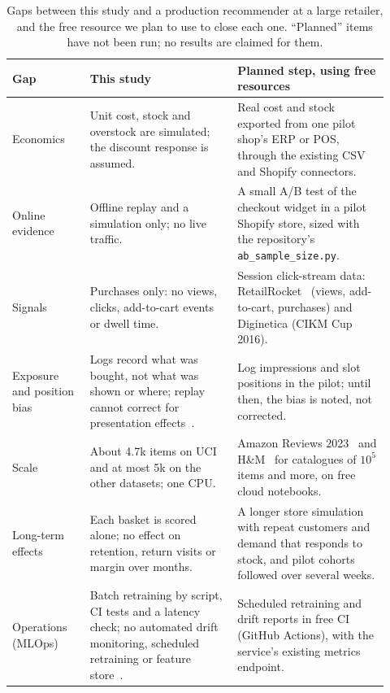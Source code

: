 \documentclass[11pt]{article}
\begin{document}
\begin{table}[t]
\centering
\caption{Gaps between this study and a production recommender at a large retailer, and the free resource we plan to use to close each one. ``Planned'' items have not been run; no results are claimed for them.}
\label{tab:gaps}
\small
\begin{tabular}{p{0.19\linewidth}p{0.36\linewidth}p{0.37\linewidth}}
\toprule
Gap & This study & Planned step, using free resources \\
\midrule
Economics & Unit cost, stock and overstock are simulated; the discount response is assumed. & Real cost and stock exported from one pilot shop's ERP or POS, through the existing CSV and Shopify connectors. \\
Online evidence & Offline replay and a simulation only; no live traffic. & A small A/B test of the checkout widget in a pilot Shopify store, sized with the repository's \texttt{ab\_sample\_size.py}. \\
Signals & Purchases only: no views, clicks, add-to-cart events or dwell time. & Session click-stream data: RetailRocket~\citep{retailrocket2016} (views, add-to-cart, purchases) and Diginetica (CIKM Cup 2016). \\
Exposure and position bias & Logs record what was bought, not what was shown or where; replay cannot correct for presentation effects~\citep{joachims2017unbiased}. & Log impressions and slot positions in the pilot; until then, the bias is noted, not corrected. \\
Scale & About 4.7k items on UCI and at most 5k on the other datasets; one CPU. & Amazon Reviews 2023~\citep{hou2024bridging} and H\&M~\citep{hm2022kaggle} for catalogues of $10^5$ items and more, on free cloud notebooks. \\
Long-term effects & Each basket is scored alone; no effect on retention, return visits or margin over months. & A longer store simulation with repeat customers and demand that responds to stock, and pilot cohorts followed over several weeks. \\
Operations (MLOps) & Batch retraining by script, CI tests and a latency check; no automated drift monitoring, scheduled retraining or feature store~\citep{sculley2015debt}. & Scheduled retraining and drift reports in free CI (GitHub Actions), with the service's existing metrics endpoint. \\
\bottomrule
\end{tabular}
\end{table}
\end{document}
